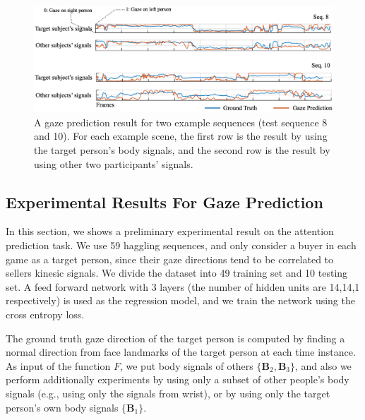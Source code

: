 \begin{figure}[h]
	\centering
	\includegraphics[width=\textwidth]{figures/gazepred_graph}
	\caption{A gaze prediction result for two example sequences (test sequence 8 and 10). For each example scene, the first row is the result by using the target person's body signals, and the second row is the result by using other two participants' signals.}
	\label{fig:gazepred_graph}
\end{figure}


\subsection{Experimental Results For Gaze Prediction}
In this section, we shows a preliminary experimental result on the attention prediction task. We use 59 haggling sequences, and only consider a buyer in each game as a target person, since their gaze directions tend to be correlated to sellers kinesic signals. We divide the dataset into 49 training set and 10 testing set. A feed forward network with 3 layers (the number of hidden units are 14,14,1 respectively) is used as the regression model, and we train the network using the cross entropy loss. 

The ground truth gaze direction of the target person is computed by finding a normal direction from face landmarks of the target person at each time instance. As input of the function $F$, we put body signals of others $\{ \mathbf{B}_2, \mathbf{B}_3 \}$, and also we perform additionally experiments by using only a subset of other people's body signals (e.g., using only the signals from wrist), or by using only the target person's own body signals $\{ \mathbf{B}_1\}$. 

